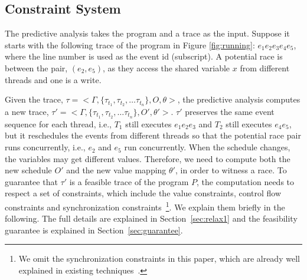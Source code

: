 


\subsection{Constraint System}
The predictive analysis takes the program and a trace as the input.  Suppose it starts with the following trace of the program in  Figure \ref{fig:running}:  $e_1 e_2 e_3 e_4 e_5$, where the line number is used as the event id (subscript). A potential race is between the pair, $(e_2, e_5)$, as they access the shared variable $x$ from different threads and one is a write. 

Given the trace, $\tau=<\Gamma , \{\tau_{t_1}, \tau_{t_2}, \dots \tau_{t_n} \}, O, \theta>$, the predictive analysis computes a new trace,  $\tau'=<\Gamma , \{\tau_{t_1}, \tau_{t_2}, \dots \tau_{t_n} \}, O', \theta'>$. $\tau'$ preserves the same event sequence for each thread, i.e., $T_1$ still executes $e_1 e_2 e_3$ and $T_2$ still executes $e_4 e_5$, but it reschedules the events from different threads so that the potential race pair runs concurrently, i.e., $e_2$ and $e_5$ run concurrently. When the schedule changes, the variables may get different values. Therefore, we need to compute both the new schedule $O'$ and the new value mapping $\theta'$, in order to witness a race. To guarantee that $\tau'$ is a feasible trace of the program $P$, the computation needs to respect a set of constraints, which include the value constraints, control flow constraints and synchronization constraints~\footnote{We omit the synchronization constraints in this paper, which are already well explained in existing techniques~\cite{yannis, pecan}.}. We explain them briefly in the following. The full details are explained in Section~\ref{sec:relax1} and the feasibility guarantee is explained in Section~\ref{sec:guarantee}.




